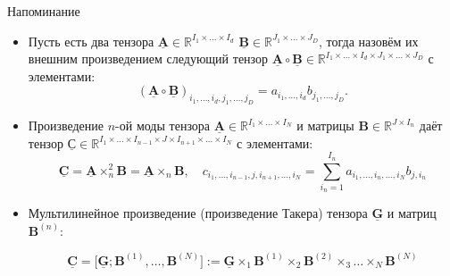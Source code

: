 
\usepackage{tikz}
\usepackage{amsmath}
\usepackage[english,russian]{babel}
\usepackage[labelformat=empty]{caption}

\usepackage{graphicx,animate}
\usepackage{animate}
\usepackage{svg}
\usepackage{subcaption}

\usepackage{ stmaryrd }

\usetikzlibrary{arrows,shapes,positioning,shadows,trees}
\newcommand*{\defeq}{\stackrel{\text{def}}{=}}
\newcommand{\tensor}[1]{\underline{\textbf{#1}}}
\newcommand{\M}[1]{\textbf{#1}}
\newcommand{\norm}[1]{\lVert #1 \rVert }

\begin{frame}[plain]
\titlepage
\end{frame}
\begin{frame}{Напоминание}
 

\begin{itemize}
    \item Пусть есть два тензора $\tensor{A} \in \mathbb{R}^{I_1 \times ... \times I_d}$ $\tensor{B} \in \mathbb{R}^{J_1 \times ... \times J_D}$,  тогда назовём  их внешним произведением следующий тензор $\tensor{A} \circ \tensor{B} \in \mathbb{R}^{I_1 \times ... \times I_d \times J_1 \times ... \times J_D}$ с элементами:
$$(\tensor{A} \circ \tensor{B})_{i_1,...,i_d,j_1,...,j_D} = a_{i_1,...,i_d}b_{j_1,...,j_D}.$$

    \item Произведение $n$-ой моды тензора $\tensor{A} \in \mathbb{R}^{I_1 \times \dots \times I_N}$ и матрицы $\M{B} \in \mathbb{R}^{J \times I_n}$ даёт тензор $\tensor{С} \in \mathbb{R}^{I_1 \times \dots \times I_{n-1} \times J \times I_{n+1} \times \dots \times I_N}$ с элементами: $$\tensor{C} = \tensor{A} \times_n^2 \M{B} = \tensor{A} \times_n \M{B}, \quad  c_{i_1, ..., i_{n-1}, j, i_{n+1}, ..., i_N} = \sum_{i_n = 1}^{I_n} a_{i_1, ..., i_n, ..., i_N} b_{j,i_n}$$
    
    \item Мультилинейное произведение (произведение Такера) тензора $\tensor{G}$ и матриц $\M{B}^{(n)}$:

    $$ \tensor{C} = \big[ \tensor{G}; \M{B}^{(1)}, \dots, \M{B}^{(N)} \big] := \tensor{G} \times_1 \M{B}^{(1)} \times_2 \M{B}^{(2)} \times_3 \dots \times_N \M{B}^{(N)} $$
\end{itemize}

\end{frame}
